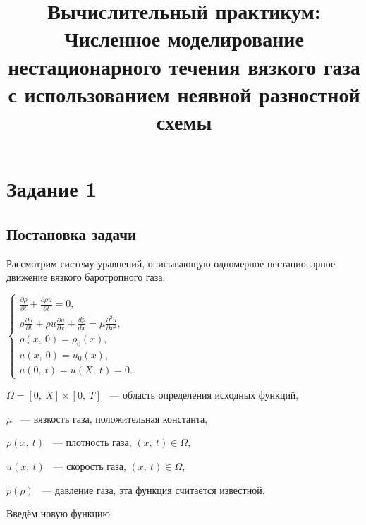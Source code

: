 \documentclass[12pt]{article}
\title{Вычислительный практикум: Численное моделирование нестационарного течения вязкого газа
с использованием неявной разностной схемы}
\begin{document}
\maketitle
\section{Задание 1}
\subsection{Постановка задачи}
Рассмотрим систему уравнений, описывающую одномерное нестационарное движение вязкого баротропного газа:

$
\begin{cases}
	\frac{\partial\rho}{\partial t} + \frac{\partial\rho u}{\partial t} = 0{,}\\
	\rho\frac{\partial u}{\partial t} + \rho u \frac{\partial u}{\partial x} + \frac{dp}{dx} = \mu \frac{\partial^2 u}{\partial x^2}{,}\\
	\rho(x{,} \:0) = \rho_0 (x),\\
	u(x{,} \:0) = u_0 (x),\\
	u(0, \:t) = u (X, \:t) = 0.
\end{cases}
$

$\Omega =\left[0{,} \:X\right] \times\left[0{,} \:T\right]$ ~--- область определения исходных функций,

$\mu$ ~--- вязкость газа, положительная константа,

$\rho (x{,} \:t)$ ~--- плотность газа, $(x{,} \:t) \in \Omega$,

 $u (x{,}\: t)$ ~--- скорость газа, $(x{,}\: t) \in \Omega$,
 
 $p(\rho)$ ~--- давление газа, эта функция считается известной. 
 
 Введём новую функцию 
\end{document}
